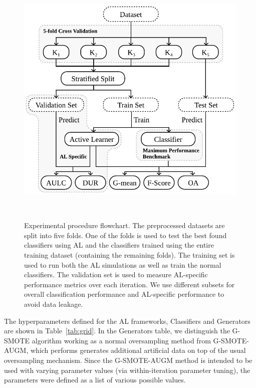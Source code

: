 \documentclass[preprint, 12pt]{elsarticle}
\begin{document}
\begin{figure}[H]
	\centering
	\includegraphics[width=.7\linewidth]{../analysis/experimental_procedure}
    \caption{%
        Experimental procedure flowchart. The preprocessed datasets are split
        into five folds. One of the folds is used to test the best found
        classifiers using AL and the classifiers trained using the entire
        training dataset (containing the remaining folds). The training set is
        used to run both the AL simulations as well as train the normal
        classifiers. The validation set is used to measure AL-specific
        performance metrics over each iteration. We use different subsets for
        overall classification performance and AL-specific performance to
        avoid data leakage.
    }~\label{fig:experimental_procedure}
\end{figure}

The hyperparameters defined for the AL frameworks, Classifiers and Generators
are shown in Table~\ref{tab:grid}. In the Generators table, we distinguish the
G-SMOTE algorithm working as a normal oversampling method from G-SMOTE-AUGM,
which performs generates additional artificial data on top of the usual
oversampling mechanism. Since the G-SMOTE-AUGM method is intended to be used
with varying parameter values (via within-iteration parameter tuning), the
parameters were defined as a list of various possible values.
\end{document}
